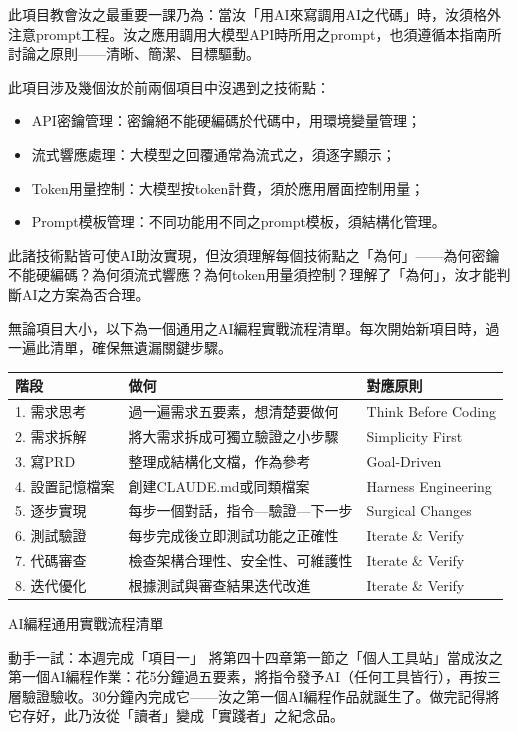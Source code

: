 此項目教會汝之最重要一課乃為：當汝「用AI來寫調用AI之代碼」時，汝須格外注意prompt工程。汝之應用調用大模型API時所用之prompt，也須遵循本指南所討論之原則——清晰、簡潔、目標驅動。


此項目涉及幾個汝於前兩個項目中沒遇到之技術點：

\begin{itemize}
  \item API密鑰管理：密鑰絕不能硬編碼於代碼中，用環境變量管理；
  \item 流式響應處理：大模型之回覆通常為流式之，須逐字顯示；
  \item Token用量控制：大模型按token計費，須於應用層面控制用量；
  \item Prompt模板管理：不同功能用不同之prompt模板，須結構化管理。
\end{itemize}

此諸技術點皆可使AI助汝實現，但汝須理解每個技術點之「為何」——為何密鑰不能硬編碼？為何須流式響應？為何token用量須控制？理解了「為何」，汝才能判斷AI之方案為否合理。


無論項目大小，以下為一個通用之AI編程實戰流程清單。每次開始新項目時，過一遍此清單，確保無遺漏關鍵步驟。

\begin{center}
\begin{tabularx}{\linewidth}{|X|X|X|}
\hline
\textbf{階段} & \textbf{做何} & \textbf{對應原則} \tabularnewline
\hline
1. 需求思考 & 過一遍需求五要素，想清楚要做何 & Think Before Coding \tabularnewline
2. 需求拆解 & 將大需求拆成可獨立驗證之小步驟 & Simplicity First \tabularnewline
3. 寫PRD & 整理成結構化文檔，作為參考 & Goal-Driven \tabularnewline
4. 設置記憶檔案 & 創建CLAUDE.md或同類檔案 & Harness Engineering \tabularnewline
5. 逐步實現 & 每步一個對話，指令—驗證—下一步 & Surgical Changes \tabularnewline
6. 測試驗證 & 每步完成後立即測試功能之正確性 & Iterate \& Verify \tabularnewline
7. 代碼審查 & 檢查架構合理性、安全性、可維護性 & Iterate \& Verify \tabularnewline
8. 迭代優化 & 根據測試與審查結果迭代改進 & Iterate \& Verify \tabularnewline
\hline
\end{tabularx}
\end{center}

\begin{center}\small\color{gray}AI編程通用實戰流程清單\end{center}

\begin{tcbpractice}{動手一試：本週完成「項目一」}
將第四十四章第一節之「個人工具站」當成汝之第一個AI編程作業：花5分鐘過五要素，將指令發予AI（任何工具皆行），再按三層驗證驗收。30分鐘內完成它——汝之第一個AI編程作品就誕生了。做完記得將它存好，此乃汝從「讀者」變成「實踐者」之紀念品。

\end{tcbpractice}

